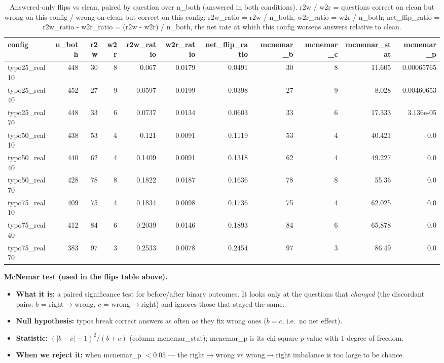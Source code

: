 \documentclass[11pt]{article}
\begin{document}
\begin{table}[H]
\centering
\caption{Answered-only flips vs clean, paired by question over n\_both (answered in both conditions). r2w / w2r = questions correct on clean but wrong on this config / wrong on clean but correct on this config; r2w\_ratio = r2w / n\_both, w2r\_ratio = w2r / n\_both; net\_flip\_ratio = r2w\_ratio - w2r\_ratio = (r2w - w2r) / n\_both, the net rate at which this config worsens answers relative to clean.}
\small
\begin{adjustbox}{max width=\textwidth}
\begin{tabular}{lrrrrrrrrrr}
\toprule
\textbf{config} & \textbf{n\_both} & \textbf{r2w} & \textbf{w2r} & \textbf{r2w\_ratio} & \textbf{w2r\_ratio} & \textbf{net\_flip\_ratio} & \textbf{mcnemar\_b} & \textbf{mcnemar\_c} & \textbf{mcnemar\_stat} & \textbf{mcnemar\_p} \\
\midrule
typo25\_real10 & 448 & 30 & 8 & 0.067 & 0.0179 & 0.0491 & 30 & 8 & 11.605 & 0.00065765 \\
typo25\_real40 & 452 & 27 & 9 & 0.0597 & 0.0199 & 0.0398 & 27 & 9 & 8.028 & 0.00460653 \\
typo25\_real70 & 448 & 33 & 6 & 0.0737 & 0.0134 & 0.0603 & 33 & 6 & 17.333 & 3.136e-05 \\
typo50\_real10 & 438 & 53 & 4 & 0.121 & 0.0091 & 0.1119 & 53 & 4 & 40.421 & 0.0 \\
typo50\_real40 & 440 & 62 & 4 & 0.1409 & 0.0091 & 0.1318 & 62 & 4 & 49.227 & 0.0 \\
typo50\_real70 & 428 & 78 & 8 & 0.1822 & 0.0187 & 0.1636 & 78 & 8 & 55.36 & 0.0 \\
typo75\_real10 & 409 & 75 & 4 & 0.1834 & 0.0098 & 0.1736 & 75 & 4 & 62.025 & 0.0 \\
typo75\_real40 & 412 & 84 & 6 & 0.2039 & 0.0146 & 0.1893 & 84 & 6 & 65.878 & 0.0 \\
typo75\_real70 & 383 & 97 & 3 & 0.2533 & 0.0078 & 0.2454 & 97 & 3 & 86.49 & 0.0 \\
\bottomrule
\end{tabular}
\end{adjustbox}
\end{table}

\medskip
\noindent\textbf{McNemar test (used in the flips table above).}
\begin{itemize}\setlength{\itemsep}{1pt}
  \item \textbf{What it is:} a paired significance test for before/after binary
  outcomes. It looks only at the questions that \emph{changed} (the discordant pairs:
  $b$ = right$\to$wrong, $c$ = wrong$\to$right) and ignores those that stayed the same.
  \item \textbf{Null hypothesis:} typos break correct answers as often as they fix
  wrong ones ($b = c$, i.e.\ no net effect).
  \item \textbf{Statistic:} $(|b - c| - 1)^2 / (b + c)$ (column mcnemar\_stat);
  mcnemar\_p is its chi-square $p$-value with 1 degree of freedom.
  \item \textbf{When we reject it:} when mcnemar\_p $< 0.05$ --- the
  right$\to$wrong vs wrong$\to$right imbalance is too large to be chance.
\end{itemize}
\end{document}
